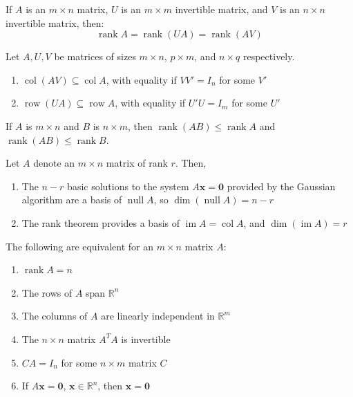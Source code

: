 \documentclass[12pt]{article}
\begin{document}
\begin{corollary}{}{}
    If $ A $ is an $ m \times n $ matrix, $ U $ is an $ m \times m $ invertible matrix, and $ V $ is an $ n \times n $ invertible matrix, then:
    \[ \operatorname{rank} A = \operatorname{rank} \left( UA \right) = \operatorname{rank} \left( AV \right) \]
\end{corollary}

\begin{lemma}{}{}
    Let $ A, U, V $ be matrices of sizes $ m \times n $, $ p \times m $, and $ n \times q $ respectively.
    \begin{enumerate}
        \item $ \operatorname{col} \left( AV \right) \subseteq \operatorname{col} A $, with equality if $ V V' = I_n $ for some $ V' $
        \item $ \operatorname{row} \left( UA \right) \subseteq \operatorname{row} A $, with equality if $ U' U = I_m $ for some $ U' $
    \end{enumerate}
\end{lemma}

\begin{corollary}{}{}
    If $ A $ is $ m \times n $ and $ B $ is $ n \times m $, then $ \operatorname{rank} \left( AB \right) \leq \operatorname{rank} A $ and $ \operatorname{rank} \left( AB \right) \leq \operatorname{rank} B $.
\end{corollary}

\begin{theorem}{}{}
    Let $ A $ denote an $ m \times n $ matrix of rank $ r $. Then,
    \begin{enumerate}
        \item The $ n - r $ basic solutions to the system $ A \mathbf{x} = \mathbf{0} $ provided by the Gaussian algorithm are a basis of $ \operatorname{null} A $, so $ \dim \left( \operatorname{null} A \right) = n - r $
        \item The rank theorem provides a basis of $ \operatorname{im} A = \operatorname{col} A $, and $ \dim \left( \operatorname{im} A \right) = r $
    \end{enumerate}
\end{theorem}

\begin{theorem}{}{}
    The following are equivalent for an $ m \times n $ matrix $ A $:
    \begin{enumerate}
        \item $ \operatorname{rank} A = n $
        \item The rows of $ A $ span $ \mathbb{R}^n $
        \item The columns of $ A $ are linearly independent in $ \mathbb{R}^m $
        \item The $ n \times n $ matrix $ A^T A $ is invertible
        \item $ CA = I_n $ for some $ n \times m $ matrix $ C $
        \item If $ A \mathbf{x} = \mathbf{0} $, $ \mathbf{x} \in \mathbb{R}^n $, then $ \mathbf{x} = \mathbf{0} $
    \end{enumerate}
\end{theorem}
\end{document}
